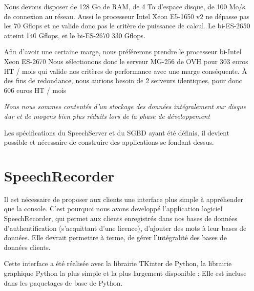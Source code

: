 \documentclass[a4paper,12pt]{report}
\begin{document}
Nous devons disposer de 128 Go de RAM, de 4 To d'espace disque, de 100 Mo/s de connexion au réseau.
Aussi le processeur Intel Xeon E5-1650 v2 ne dépasse pas les 70 Gflops et ne valide donc pas le critère de puissance de calcul.
Le bi-ES-2650 atteint 140 Gflops, et le bi-ES-2670 330 Gflops.

\smallskip{}

Afin d'avoir une certaine marge, nous préférerons prendre le processeur bi-Intel Xeon ES-2670
\smallskip{}
Nous sélectionons donc le serveur MG-256 de OVH pour 303 euros HT / mois qui valide nos critères de performance avec une marge conséquente.
\smallskip{}
À des fins de redondance, nous aurions besoin de 2 serveurs identiques, pour donc 606 euros HT / mois



\emph{Nous nous sommes contentés d'un stockage des données intégralement sur disque dur et de moyens bien plus réduits lors de la phase de développement}

\bigskip{}
\bigskip{}

Les spécifications du SpeechServer et du SGBD ayant été définis, il devient possible et nécessaire de construire des applications se fondant dessus.

\section{SpeechRecorder}

Il est nécessaire de proposer aux clients une interface plus simple à appréhender que la console. C'est pourquoi nous avons developpé l'application logiciel SpeechRecorder, qui permet aux clients enregistrés dans nos bases de données d'authentification (s'acquittant d'une licence), d'ajouter des mots à leur bases de données. Elle devrait permettre à terme, de gérer l'intégralité des bases de données clients.

\medskip{}

Cette interface a été réalisée avec la librairie TKinter de Python, la librairie graphique Python la plus simple et la plus largement disponible : Elle est incluse dans les paquetages de base de Python.
\end{document}
